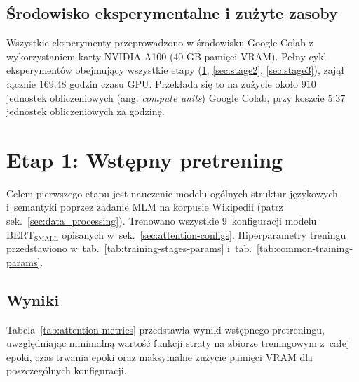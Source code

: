 \documentclass[a4paper,11pt,twoside]{report}
\theoremstyle{definition}
\begin{document}



\subsection{Środowisko eksperymentalne i zużyte zasoby}

Wszystkie eksperymenty przeprowadzono w środowisku Google Colab z wykorzystaniem karty NVIDIA A100 ($40$ GB pamięci VRAM). Pełny cykl eksperymentów obejmujący wszystkie etapy (\ref{sec:stage1}, \ref{sec:stage2}, \ref{sec:stage3}),  zajął łącznie $169.48$ godzin czasu GPU. Przekłada się to na zużycie około $910$ jednostek obliczeniowych (ang. \emph{compute units}) Google Colab, przy koszcie $5.37$ jednostek obliczeniowych za godzinę.


\section{Etap 1: Wstępny pretrening}\label{sec:stage1}

Celem pierwszego etapu jest nauczenie modelu ogólnych struktur językowych i~semantyki poprzez zadanie MLM na korpusie Wikipedii (patrz sek.~\ref{sec:data_processing}). Trenowano wszystkie 9~konfiguracji modelu $\text{BERT}_{\text{SMALL}}$ opisanych w~sek.~\ref{sec:attention-configs}. Hiperparametry treningu przedstawiono w~tab.~\ref{tab:training-stages-params} i~tab.~\ref{tab:common-training-params}.



\subsection{Wyniki}

Tabela~\ref{tab:attention-metrics} przedstawia wyniki wstępnego pretreningu, uwzględniając minimalną wartość funkcji straty na zbiorze treningowym z~całej epoki, czas trwania epoki oraz maksymalne zużycie pamięci VRAM dla poszczególnych konfiguracji.
\end{document}
